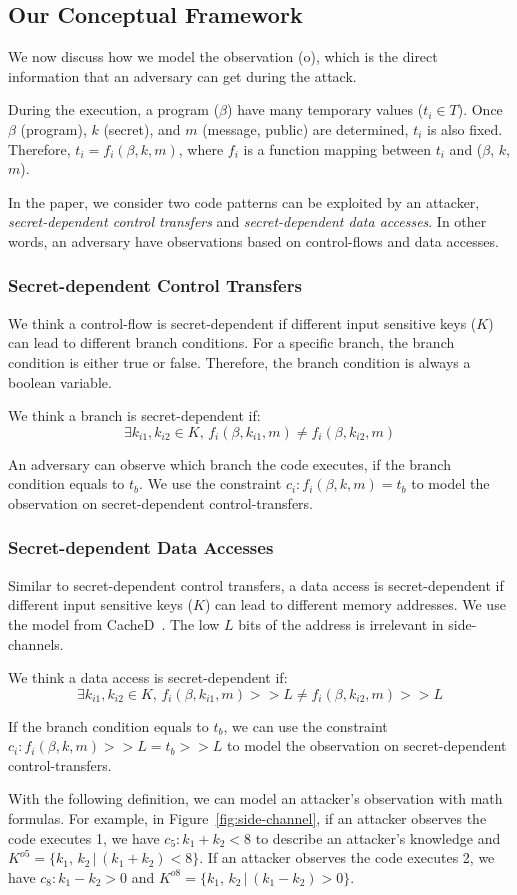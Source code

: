 \subsection{Our Conceptual Framework}
\label{side-channel:condition}
We now discuss how we model the observation (o), which is the direct information
that an adversary can get during the attack.

During the execution, a program ($\beta$) have many temporary values ($t_i \in
T$). Once $\beta$ (program), $k$ (secret), and $m$ (message, public) are
determined, $t_i$ is also fixed. Therefore, $ t_i = f_i(\beta, k, m)$, where $f_
i$ is a function mapping between $t_i$ and ($\beta$, $k$, $m$).

In the paper, we consider two code patterns can be exploited by an attacker,
\emph{secret-dependent control transfers} and \emph{secret-dependent data
accesses}. In other words, an adversary have observations based on control-flows
and data accesses.

\subsubsection{Secret-dependent Control Transfers}
We think a control-flow is secret-dependent if different input sensitive keys
($K$) can lead to different branch conditions. For a specific branch, the branch
condition is either true or false. Therefore, the branch condition is always a
boolean variable.

We think a branch is secret-dependent if:
$$\exists k_{i1}, k_{i2} \in K, \,f_i(\beta, k_{i1}, m) \neq f_i(\beta, k_{i2}, m)$$

An adversary can observe which branch the code executes, if the branch condition
equals to $t_b$. We use the constraint $c_i : f_i(\beta, k, m) = t_b$ to model
the observation on secret-dependent control-transfers.

\subsubsection{Secret-dependent Data Accesses}
Similar to secret-dependent control transfers, a data access is
secret-dependent if different input sensitive keys ($K$) can lead to different
memory addresses. We use the model from CacheD~\cite{203878}. The low $L$ bits
of the address is irrelevant in side-channels.

We think a data access is secret-dependent if:
$$\exists k_{i1}, k_{i2} \in K, \,f_i(\beta, k_{i1}, m) >> L \neq f_i(\beta, k_{i2}, m) >> L$$

If the branch condition equals to $t_b$, we can use the constraint $c_i :
f_i(\beta, k, m) >> L = t_b >> L$ to model the observation on secret-dependent
control-transfers.

With the following definition, we can model an attacker's observation with math
formulas. For example, in Figure~\ref{fig:side-channel}, if an attacker
observes the code executes 1, we have $c_5: k_1 + k_2 < 8$ to describe an
attacker's knowledge and $K^{o5} = \{k_1,\, k_2\,|\, (k_1 + k_2) < 8\}$. If an
attacker observes the code executes 2, we have $c_8: k_1 - k_2 > 0$ and $K^{o8}
= \{k_1,\, k_2\,|\, (k_1 - k_2) > 0\}$.

